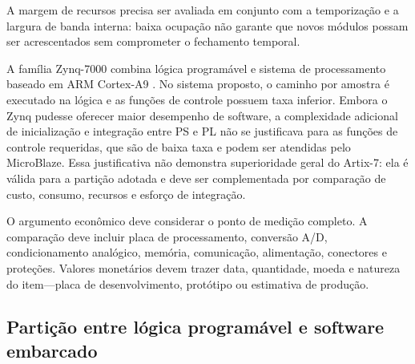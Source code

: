 A margem de recursos precisa ser avaliada em conjunto com a temporização e a largura de banda interna: baixa ocupação não garante que novos módulos possam ser acrescentados sem comprometer o fechamento temporal.

A família Zynq-7000 combina lógica programável e sistema de processamento baseado em ARM Cortex-A9 \cite{xilinx2018ds190}. No sistema proposto, o caminho por amostra é executado na lógica e as funções de controle possuem taxa inferior. Embora o Zynq pudesse oferecer maior desempenho de software, a complexidade adicional de inicialização e integração entre PS e PL não se justificava para as funções de controle requeridas, que são de baixa taxa e podem ser atendidas pelo MicroBlaze. Essa justificativa não demonstra superioridade geral do Artix-7: ela é válida para a partição adotada e deve ser complementada por comparação de custo, consumo, recursos e esforço de integração.

O argumento econômico deve considerar o ponto de medição completo. A comparação deve incluir placa de processamento, conversão A/D, condicionamento analógico, memória, comunicação, alimentação, conectores e proteções. Valores monetários devem trazer data, quantidade, moeda e natureza do item---placa de desenvolvimento, protótipo ou estimativa de produção.

\subsection{Partição entre lógica programável e software embarcado}
\label{v2:subsec:divisao_hw_sw}

